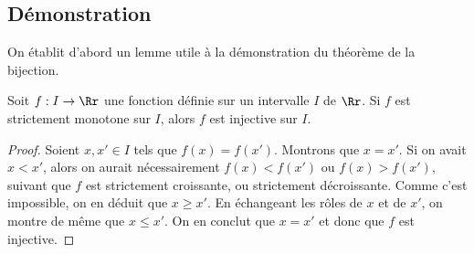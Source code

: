 \documentclass[class=report,crop=false]{standalone}
\begin{document}
\subsection{Démonstration}

On établit d'abord un lemme utile à la démonstration du \og{}théorème de la bijection\fg{}.

\begin{lemme}
Soit $f:I\to \Rr$ une fonction définie sur un intervalle $I$ de $\Rr$. Si $f$ est
strictement monotone sur $I$, alors $f$ est injective sur $I$.
\end{lemme}

\begin{proof}
Soient $x,x' \in I$ tels que $f(x)=f(x')$. Montrons que $x=x'$. Si on avait $x<x'$,
alors on aurait nécessairement $f(x)<f(x')$ ou $f(x)>f(x')$, suivant que $f$ est
strictement croissante, ou strictement décroissante. Comme c'est impossible,
on en déduit que $x\geq x'$. En échangeant les rôles de $x$ et de $x'$,
on montre de même que $x\leq x'$. On en conclut que $x=x'$ et donc que $f$ est injective.
\end{proof}
\end{document}
